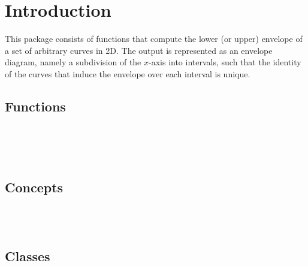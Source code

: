 \clearpage
{}
\label{chapterEnvelope2Ref}


\section*{Introduction}
\label{env2_ref_sec:intro}

This package consists of functions that compute the lower (or upper)
envelope of a set of arbitrary curves in 2D. The output is
represented as an envelope diagram, namely a subdivision of the
$x$-axis into intervals, such that the identity of the curves that
induce the envelope over each interval is unique.

\subsection*{Functions}

\\
\\
\\

\subsection*{Concepts}

\\
\\

\subsection*{Classes}



